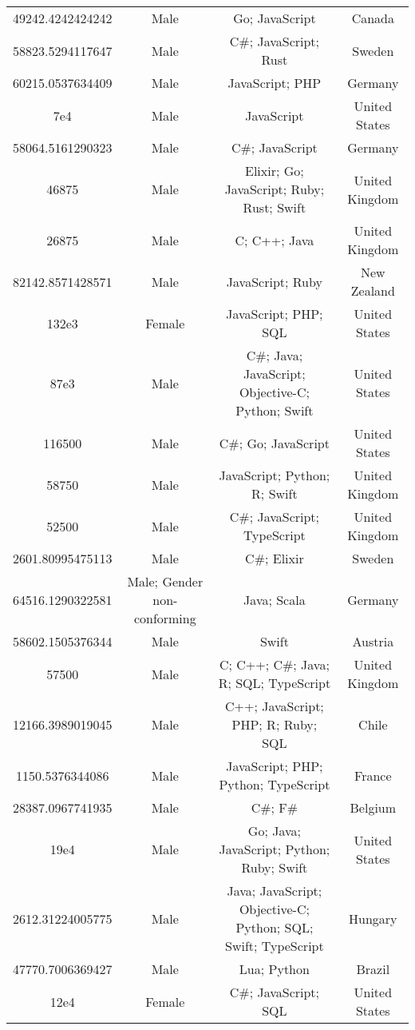\begin{center}
\begin{tabular}{ |c|c|c|c| }
49242.4242424242  &  Male  &  Go; JavaScript  &  Canada  \\ 
58823.5294117647  &  Male  &  C\#; JavaScript; Rust  &  Sweden  \\ 
60215.0537634409  &  Male  &  JavaScript; PHP  &  Germany  \\ 
7e4  &  Male  &  JavaScript  &  United States  \\ 
58064.5161290323  &  Male  &  C\#; JavaScript  &  Germany  \\ 
46875  &  Male  &  Elixir; Go; JavaScript; Ruby; Rust; Swift  &  United Kingdom  \\ 
26875  &  Male  &  C; C++; Java  &  United Kingdom  \\ 
82142.8571428571  &  Male  &  JavaScript; Ruby  &  New Zealand  \\ 
132e3  &  Female  &  JavaScript; PHP; SQL  &  United States  \\ 
87e3  &  Male  &  C\#; Java; JavaScript; Objective-C; Python; Swift  &  United States  \\ 
116500  &  Male  &  C\#; Go; JavaScript  &  United States  \\ 
58750  &  Male  &  JavaScript; Python; R; Swift  &  United Kingdom  \\ 
52500  &  Male  &  C\#; JavaScript; TypeScript  &  United Kingdom  \\ 
2601.80995475113  &  Male  &  C\#; Elixir  &  Sweden  \\ 
64516.1290322581  &  Male; Gender non-conforming  &  Java; Scala  &  Germany  \\ 
58602.1505376344  &  Male  &  Swift  &  Austria  \\ 
57500  &  Male  &  C; C++; C\#; Java; R; SQL; TypeScript  &  United Kingdom  \\ 
12166.3989019045  &  Male  &  C++; JavaScript; PHP; R; Ruby; SQL  &  Chile  \\ 
1150.5376344086  &  Male  &  JavaScript; PHP; Python; TypeScript  &  France  \\ 
28387.0967741935  &  Male  &  C\#; F\#  &  Belgium  \\ 
19e4  &  Male  &  Go; Java; JavaScript; Python; Ruby; Swift  &  United States  \\ 
2612.31224005775  &  Male  &  Java; JavaScript; Objective-C; Python; SQL; Swift; TypeScript  &  Hungary  \\ 
47770.7006369427  &  Male  &  Lua; Python  &  Brazil  \\ 
12e4  &  Female  &  C\#; JavaScript; SQL  &  United States  \\ 

\end{tabular}
\end{center}
